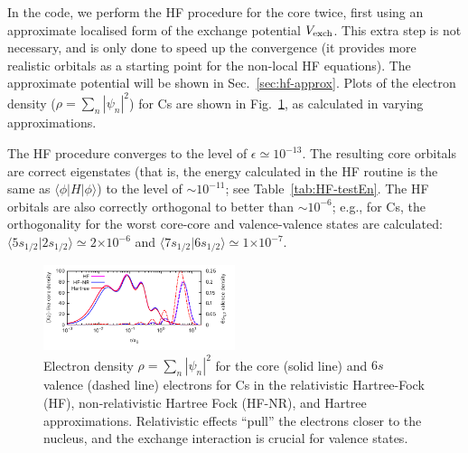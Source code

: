 \documentclass[10pt,twocolumn,a4paper]{article}%
\newcommand{\braket}[1]{\ensuremath{\langle #1\rangle}}	%
\newcommand{\E}[1]{\ensuremath{\times10^{#1}}}	%
\begin{document}
In the code, we perform the HF procedure for the core twice, first using an approximate localised form of the exchange potential $V_{\rm exch}$.
This extra step is not necessary, and is only done to speed up the convergence (it provides more realistic orbitals as a starting point for the non-local HF equations).
The approximate potential will be shown in Sec.~\ref{sec:hf-approx}.
%
Plots of the electron density ($\rho = \sum_n|\psi_n|^2$) for Cs are shown in Fig.~\ref{fig:ElectronDensity}, as calculated in varying approximations.

The HF procedure converges to the level of $\epsilon\simeq10^{-13}$.
The resulting core orbitals are correct eigenstates (that is, the energy calculated in the HF routine is the same as $\braket{\phi|H|\phi}$) to the level of $\sim10^{-11}$; see Table~\ref{tab:HF-testEn}.
The HF orbitals are also correctly orthogonal to better than $\sim10^{-6}$; e.g., for Cs, the orthogonality for the worst core-core and valence-valence states are calculated:
$\braket{5s_{1/2}|2s_{1/2}} \simeq 2\E{-6}$ and
$\braket{7s_{1/2}|6s_{1/2}} \simeq 1\E{-7}$.




\begin{figure}
\centering
\includegraphics[width=0.5\textwidth]{img/DensityPlot-Cs}
\caption{\small Electron density $\rho = \sum_n|\psi_n|^2$ for the core (solid line) and $6s$ valence (dashed line) electrons for Cs in the relativistic Hartree-Fock (HF), non-relativistic Hartree Fock (HF-NR), and Hartree approximations. Relativistic effects ``pull'' the electrons closer to the nucleus, and the exchange interaction is crucial for valence states.\label{fig:ElectronDensity}}
\end{figure}
\end{document}
